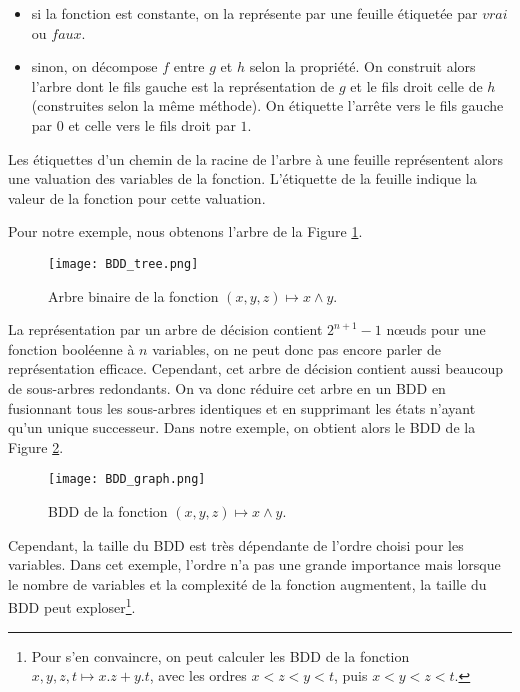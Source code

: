 \begin{itemize}
\item
  si la fonction est constante, on la représente par une feuille
  étiquetée par \(vrai\) ou \(faux\).
\item
  sinon, on décompose \(f\) entre \(g\) et \(h\) selon la propriété. On
  construit alors l'arbre dont le fils gauche est la représentation de
  \(g\) et le fils droit celle de \(h\) (construites selon la même méthode).
  On étiquette l'arrête vers le fils gauche par \(0\) et celle vers le fils
  droit par \(1\).
\end{itemize}

Les étiquettes d'un chemin de la racine de l'arbre à une feuille représentent
alors une valuation des variables de la fonction. L'étiquette de la feuille
indique la valeur de la fonction pour cette valuation.

Pour notre exemple, nous obtenons l'arbre de la Figure \ref{fig:BDD_tree}.

\begin{figure}[ht!]
\begin{center}
  \texttt{[image: BDD\_tree.png]}
\end{center}
\caption{Arbre binaire de la fonction \((x,y,z) \mapsto x \land y\).}
\label{fig:BDD_tree}
\end{figure}

La représentation par un arbre de décision contient \(2^{n+1} - 1\) nœuds pour
une fonction booléenne à \(n\) variables, on ne peut donc pas encore parler de
représentation efficace. Cependant, cet arbre de décision contient aussi
beaucoup de sous-arbres redondants. On va donc réduire cet arbre en un \ac{BDD} en
fusionnant tous les sous-arbres identiques et en supprimant les états n'ayant
qu'un unique successeur. Dans notre exemple, on obtient alors le \ac{BDD} de la
Figure \ref{fig:BDD_graph}.

\begin{figure}[h]
\begin{center}
\texttt{[image: BDD\_graph.png]}
\end{center}
\caption{BDD de la fonction \((x,y,z) \mapsto x \land y\).}
\label{fig:BDD_graph}
\end{figure}

Cependant, la taille du \ac{BDD} est très dépendante de l'ordre choisi pour
les variables\cite{OBDD}. Dans cet exemple, l'ordre n'a pas une grande importance
mais lorsque le nombre de variables et la complexité de la fonction
augmentent, la taille du \ac{BDD} peut exploser\footnote{Pour s'en
  convaincre, on peut calculer les \ac{BDD} de la fonction
  \(x, y, z, t \mapsto x.z + y.t\), avec les ordres \(x<z<y<t\), puis
  \(x<y<z<t\).}.

